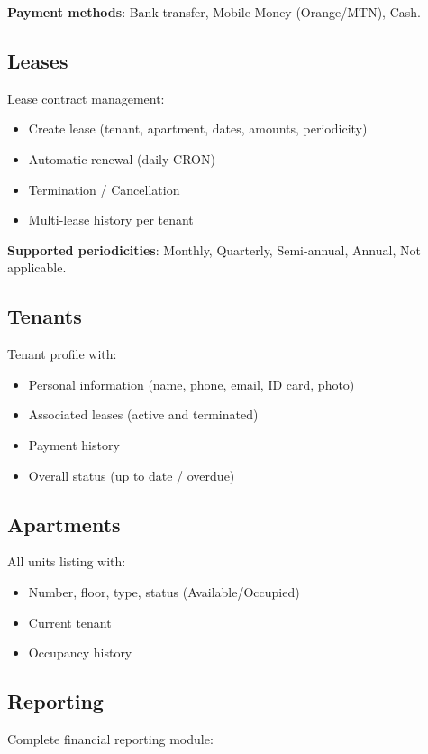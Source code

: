 \documentclass[a4paper,11pt]{article}
\begin{document}
\textbf{Payment methods}: Bank transfer, Mobile Money (Orange/MTN), Cash.

\subsection{Leases}

Lease contract management:
\begin{itemize}
  \item Create lease (tenant, apartment, dates, amounts, periodicity)
  \item Automatic renewal (daily CRON)
  \item Termination / Cancellation
  \item Multi-lease history per tenant
\end{itemize}

\textbf{Supported periodicities}: Monthly, Quarterly, Semi-annual, Annual, Not applicable.

\subsection{Tenants}

Tenant profile with:
\begin{itemize}
  \item Personal information (name, phone, email, ID card, photo)
  \item Associated leases (active and terminated)
  \item Payment history
  \item Overall status (up to date / overdue)
\end{itemize}

\subsection{Apartments}

All units listing with:
\begin{itemize}
  \item Number, floor, type, status (Available/Occupied)
  \item Current tenant
  \item Occupancy history
\end{itemize}

\subsection{Reporting}

Complete financial reporting module:
\end{document}
